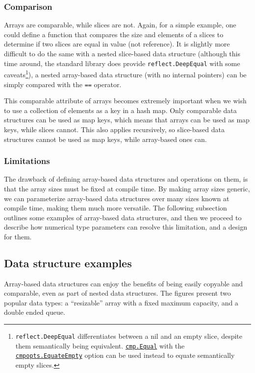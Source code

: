 \subsubsection{Comparison}

Arrays are comparable, while slices are not. Again, for a simple example, one
could define a function that compares the size and elements of a slices to
determine if two slices are equal in value (not reference). It is slightly more
difficult to do the same with a nested slice-based data structure (although this
time around, the standard library does provide \texttt{reflect.DeepEqual} with
some caveats\footnote{\texttt{reflect.DeepEqual} differentiates between a nil
	and an empty slice, despite them semantically being equivalent.
	\href{https://pkg.go.dev/github.com/google/go-cmp/cmp\#Equal}{\texttt{cmp.Equal}}
	with the
	\href{https://pkg.go.dev/github.com/google/go-cmp/cmp/cmpopts\#EquateEmpty}{\texttt{cmpopts.EquateEmpty}}
	option can be used instead to equate semantically empty slices.}),
a nested array-based data structure (with no internal pointers) can be simply
compared with the \texttt{==} operator.

This comparable attribute of arrays becomes extremely important when we wish to
use a collection of elements as a key in a hash map. Only comparable data
structures can be used as map keys, which means that arrays can be used as map
keys, while slices cannot. This also applies recursively, so slice-based data
structures cannot be used as map keys, while array-based ones can.

\subsubsection{Limitations}

The drawback of defining array-based data structures and operations on them, is
that the array sizes must be fixed at compile time. By making array sizes
generic, we can parameterize array-based data structures over many sizes known
at compile time, making them much more versatile. The following subsection
outlines some examples of array-based data structures, and then we proceed to
describe how numerical type parameters can resolve this limitation, and a design
for them.

\subsection{Data structure examples}

Array-based data structures can enjoy the benefits of being easily copyable and
comparable, even as part of nested data structures. The figures present two
popular data types: a ``resizable'' array with a fixed maximum capacity, and a
double ended queue.

